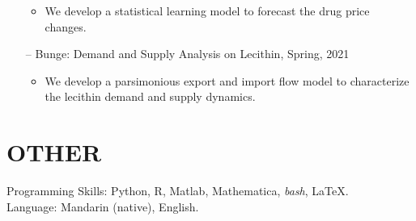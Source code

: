 \documentclass[margin, 10pt]{res} %
\begin{document}
\begin{resume}
\begin{itemize}
        \begin{itemize}
            \item We develop a statistical learning model to forecast the drug price changes.
        \end{itemize}
    \item[--]Bunge: Demand and Supply Analysis on Lecithin, Spring, 2021
        \begin{itemize}
            \item We develop a parsimonious export and import flow model to characterize the lecithin demand and supply dynamics.
        \end{itemize}
\end{itemize}

\section{OTHER}
Programming Skills: Python, R, Matlab, Mathematica, {\it bash}, \LaTeX.\\
Language: Mandarin (native), English.


\end{resume}
\end{document}
